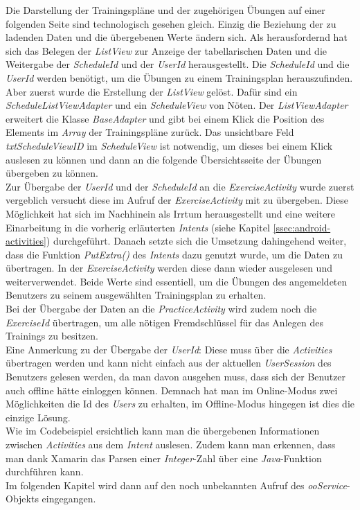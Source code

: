 Die Darstellung der Trainingspläne und der zugehörigen Übungen auf einer folgenden Seite sind technologisch gesehen gleich. Einzig die Beziehung der zu ladenden Daten und die übergebenen Werte ändern sich. Als herausfordernd hat sich das Belegen der \textit{ListView} zur Anzeige der tabellarischen Daten und die Weitergabe der \textit{ScheduleId} und der \textit{UserId} herausgestellt. Die \textit{ScheduleId} und die \textit{UserId} werden benötigt, um die Übungen zu einem Trainingsplan herauszufinden. Aber zuerst wurde die Erstellung der \textit{ListView} gelöst. Dafür sind ein \textit{ScheduleListViewAdapter} und ein \textit{ScheduleView} von Nöten. Der \textit{ListViewAdapter} erweitert die Klasse \textit{BaseAdapter} und gibt bei einem Klick die Position des Elements im \textit{Array} der Trainingspläne zurück. Das unsichtbare Feld \textit{txtScheduleViewID} im \textit{ScheduleView} ist notwendig, um dieses bei einem Klick auslesen zu können und dann an die folgende Übersichtsseite der Übungen übergeben zu können.\\
Zur Übergabe der \textit{UserId} und der \textit{ScheduleId} an die \textit{ExerciseActivity} wurde zuerst vergeblich versucht diese im Aufruf der \textit{ExerciseActivity} mit zu übergeben. Diese Möglichkeit hat sich im Nachhinein als Irrtum herausgestellt und eine weitere Einarbeitung in die vorherig erläuterten \textit{Intents} (siehe Kapitel \ref{ssec:android-activities}) durchgeführt. Danach setzte sich die Umsetzung dahingehend weiter, dass die Funktion \textit{PutExtra()} des \textit{Intents} dazu genutzt wurde, um die Daten zu übertragen. In der \textit{ExerciseActivity} werden diese dann wieder ausgelesen und weiterverwendet. Beide Werte sind essentiell, um die Übungen des angemeldeten Benutzers zu seinem ausgewählten Trainingsplan zu erhalten.\\

Bei der Übergabe der Daten an die \textit{PracticeActivity} wird zudem noch die \textit{ExerciseId} übertragen, um alle nötigen Fremdschlüssel für das Anlegen des Trainings zu besitzen.\\
Eine Anmerkung zu der Übergabe der \textit{UserId}: Diese muss über die \textit{Activities} übertragen werden und kann nicht einfach aus der aktuellen \textit{UserSession} des Benutzers gelesen werden, da man davon ausgehen muss, dass sich der Benutzer auch offline hätte einloggen können. Demnach hat man im Online-Modus zwei Möglichkeiten die Id des \textit{Users} zu erhalten, im Offline-Modus hingegen ist dies die einzige Lösung.\\

Wie im Codebeispiel ersichtlich kann man die übergebenen Informationen zwischen \textit{Activities} aus dem \textit{Intent} auslesen. Zudem kann man erkennen, dass man dank Xamarin das Parsen einer \textit{Integer}-Zahl über eine \textit{Java}-Funktion durchführen kann.\\
Im folgenden Kapitel wird dann auf den noch unbekannten Aufruf des \textit{ooService}-Objekts eingegangen.
